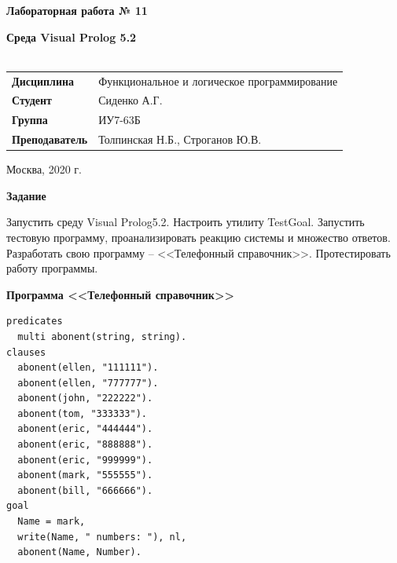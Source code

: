 \documentclass[a4paper,14pt]{extreport} %
\begin{document}
\begin{titlepage}
    \vspace{4cm}

    \begin{center}
        \textbf{Лабораторная работа № 11} \\ 
        \hfill
        
        \textbf{Среда Visual Prolog 5.2} \\
        \vspace{0.5cm}
        \textbf{} \\
    \end{center}

    \vspace{4cm}

    \begin{flushleft}
        \begin{tabular}{ll}
            \textbf{Дисциплина} & Функциональное и логическое программирование \\
            \textbf{Студент} & Сиденко А.Г. \\
            \textbf{Группа} & ИУ7-63Б \\
            \textbf{Преподаватель} & Толпинская Н.Б., Строганов Ю.В.  \\
        \end{tabular}
    \end{flushleft}

    \vspace{4cm}

   \begin{center}
        Москва, 2020 г.
    \end{center}

\end{titlepage}

\textbf{Задание}

Запустить среду Visual Prolog5.2. Настроить утилиту TestGoal. Запустить тестовую программу, проанализировать реакцию системы и множество ответов. Разработать свою программу -- <<Телефонный справочник>>. Протестировать работу программы. 

\textbf{Программа <<Телефонный справочник>>}

\begin{lstlisting}
predicates
  multi abonent(string, string).
clauses
  abonent(ellen, "111111").
  abonent(ellen, "777777").
  abonent(john, "222222").
  abonent(tom, "333333").
  abonent(eric, "444444").
  abonent(eric, "888888").
  abonent(eric, "999999").
  abonent(mark, "555555").
  abonent(bill, "666666").
goal
  Name = mark,
  write(Name, " numbers: "), nl,
  abonent(Name, Number).
\end{lstlisting}
\end{document}
